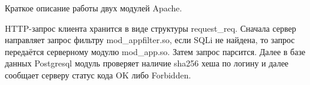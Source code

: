 Краткое описание работы двух модулей Apache.

HTTP-\/запрос клиента хранится в виде структуры request\+\_\+req. Сначала сервер направляет запрос фильтру mod\+\_\+appfilter.\+so, если SQLi не найдена, то запрос передаётся серверному модулю mod\+\_\+app.\+so. Затем запрос парсится. Далее в базе данных Postgresql модуль проверяет наличие sha256 хеша по логину и далее сообщает серверу статус кода OK либо Forbidden. 